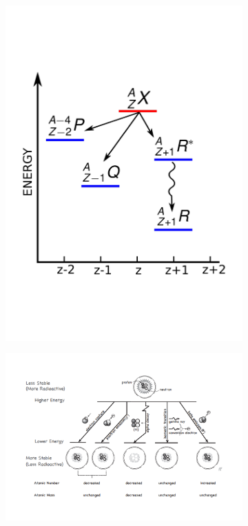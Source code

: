 \begin{figure}[!htbp]
\begin{subfigure}[t]{.49\textwidth}
\centering
\includegraphics[width=0.9\linewidth, trim={0 4cm 0 3cm}, clip]{03_GraphicFiles/chapter1_Introduction/decayScheme.pdf}
\caption{}
\label{chap1::fig::decayScheme}
\end{subfigure}
\begin{subfigure}[t]{.49\textwidth}
\centering
\includegraphics[width=0.98\linewidth]{03_GraphicFiles/chapter1_Introduction/decaySchematicSimple.pdf}
\caption{}
\label{chap1::fig::nuclides}
\end{subfigure}
\caption{}
\label{chap1::fig::radioactiveDecay}
\end{figure} 

